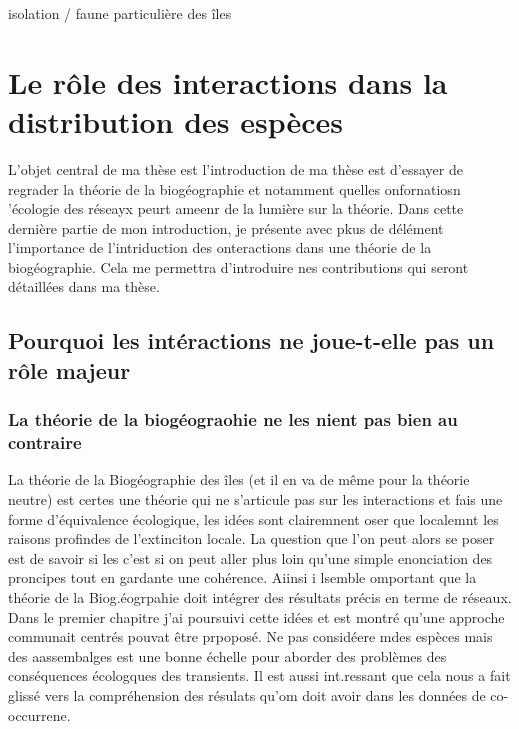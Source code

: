 isolation / faune particulière des îles

\section*{Le rôle des interactions dans la distribution des
espèces}\label{le-ruxf4le-des-interactions-dans-la-distribution-des-espuxe8ces}

L'objet central de ma thèse est l'introduction de ma thèse est d'essayer
de regrader la théorie de la biogéographie et notamment quelles
onfornatiosn 'écologie des réseayx peurt ameenr de la lumière sur la
théorie. Dans cette dernière partie de mon introduction, je présente
avec pkus de délément l'importance de l'intriduction des onteractions
dans une théorie de la biogéographie. Cela me permettra d'introduire nes
contributions qui seront détaillées dans ma thèse.

\subsection{Pourquoi les intéractions ne joue-t-elle pas un rôle
majeur}\label{pourquoi-les-intuxe9ractions-ne-joue-t-elle-pas-un-ruxf4le-majeur}

\subsubsection{La théorie de la biogéograohie ne les nient pas bien au
contraire}\label{la-thuxe9orie-de-la-bioguxe9ograohie-ne-les-nient-pas-bien-au-contraire}

La théorie de la Biogéographie des îles (et il en va de même pour la
théorie neutre) est certes une théorie qui ne s'articule pas sur les
interactions et fais une forme d'équivalence écologique, les idées sont
clairemnent oser que localemnt les raisons profindes de l'extinciton
locale. La question que l'on peut alors se poser est de savoir si les
c'est si on peut aller plus loin qu'une simple enonciation des proncipes
tout en gardante une cohérence. Aiinsi i lsemble omportant que la
théorie de la Biog.éogrpahie doit intégrer des résultats précis en terme
de réseaux. Dans le premier chapitre j'ai poursuivi cette idées et est
montré qu'une approche communait centrés pouvat être prpoposé. Ne pas
considéere mdes espèces mais des aassembalges est une bonne échelle pour
aborder des problèmes des conséquences écologques des transients. Il est
aussi int.ressant que cela nous a fait glissé vers la compréhension des
résulats qu'om doit avoir dans les données de co-occurrene.

